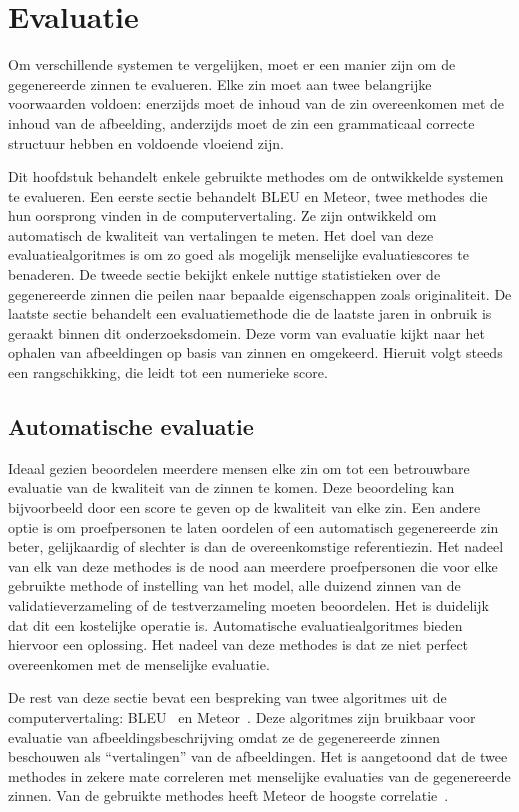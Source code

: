 \chapter{Evaluatie}
\label{hoofdstuk:evaluatie}
Om verschillende systemen te vergelijken, moet er een manier zijn om de gegenereerde zinnen te evalueren. Elke zin moet aan twee belangrijke voorwaarden voldoen: enerzijds moet de inhoud van de zin overeenkomen met de inhoud van de afbeelding, anderzijds moet de zin een grammaticaal correcte structuur hebben en voldoende vloeiend zijn.

Dit hoofdstuk behandelt enkele gebruikte methodes om de ontwikkelde systemen te evalueren. Een eerste sectie behandelt BLEU en Meteor, twee methodes die hun oorsprong vinden in de computervertaling. Ze zijn ontwikkeld om automatisch de kwaliteit van vertalingen te meten. Het doel van deze evaluatiealgoritmes is om zo goed als mogelijk menselijke evaluatiescores te benaderen. De tweede sectie bekijkt enkele nuttige statistieken over de gegenereerde zinnen die peilen naar bepaalde eigenschappen zoals originaliteit. De laatste sectie behandelt een evaluatiemethode die de laatste jaren in onbruik is geraakt binnen dit onderzoeksdomein. Deze vorm van evaluatie kijkt naar het ophalen van afbeeldingen op basis van zinnen en omgekeerd. Hieruit volgt steeds een rangschikking, die leidt tot een numerieke score.


\section{Automatische evaluatie}
Ideaal gezien beoordelen meerdere mensen elke zin om tot een betrouwbare evaluatie van de kwaliteit van de zinnen te komen. Deze beoordeling kan bijvoorbeeld door een score te geven op de kwaliteit van elke zin. Een andere optie is om proefpersonen te laten oordelen of een automatisch gegenereerde zin beter, gelijkaardig of slechter is dan de overeenkomstige referentiezin. Het nadeel van elk van deze methodes is de nood aan meerdere proefpersonen die voor elke gebruikte methode of instelling van het model, alle duizend zinnen van de validatieverzameling of de testverzameling moeten beoordelen. Het is duidelijk dat dit een kostelijke operatie is. Automatische evaluatiealgoritmes bieden hiervoor een oplossing. Het nadeel van deze methodes is dat ze niet perfect overeenkomen met de menselijke evaluatie.

De rest van deze sectie bevat een bespreking van twee algoritmes uit de computervertaling: BLEU~\cite{Papineni2001} en Meteor~\cite{Denkowski2007a}. Deze algoritmes zijn bruikbaar voor evaluatie van afbeeldingsbeschrijving omdat ze de gegenereerde zinnen beschouwen als ``vertalingen'' van de afbeeldingen. Het is aangetoond dat de twee methodes in zekere mate correleren met menselijke evaluaties van de gegenereerde zinnen. Van de gebruikte methodes heeft Meteor de hoogste correlatie~\cite{Elliott2014}.

